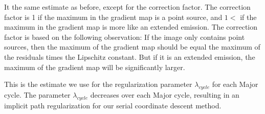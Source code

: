 It the same estimate as before, except for the correction factor. The correction factor is 1 if the maximum in the gradient map is a point source, and $1 <$ if the maximum in the gradient map is more like an extended emission. The correction factor is based on the following observation: If the image only contains point sources, then the maximum of the gradient map should be equal the maximum of the residuals times the Lipschitz constant. But if it is an extended emission, the maximum of the gradient map will be significantly larger.

This is the estimate we use for the regularization parameter $\lambda_{cycle}$ for each Major cycle. The parameter $\lambda_{cycle}$ decreases over each Major cycle, resulting in an implicit path regularization for our serial coordinate descent method.

